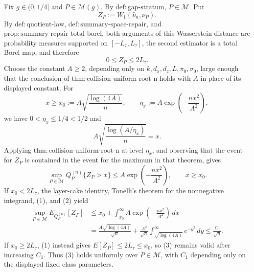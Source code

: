 Fix \(g\in(0,1/4]\) and \(P\in\mathcal M(g)\).  By \(\mathrm{def:gap\text{-}stratum}\), \(P\in\mathcal M\).  Put
\[
 Z_P:=W_1(\widehat\nu_n,\nu_P).
\]
By \(\mathrm{def:quotient\text{-}law}\), \(\mathrm{def:summary\text{-}space\text{-}repair}\), and \(\mathrm{prop:summary\text{-}repair\text{-}total\text{-}borel}\), both arguments of this Wasserstein distance are probability measures supported on \([-L_{\tau},L_{\tau}]\), the second estimator is a total Borel map, and therefore
\[
 0\le Z_P\le 2L_{\tau}.                                                    \tag{1}
\]
Choose the constant \(A\ge2\), depending only on \(k,d_x,d_z,L,\pi_0,\sigma_0\), large enough that the conclusion of \(\mathrm{thm:collision\text{-}uniform\text{-}root\text{-}n}\) holds with \(A\) in place of its displayed constant.  For
\[
 x\ge x_0:=A\sqrt{\frac{\log(4A)}{n}},
 \qquad
 \eta_x:=A\exp\!\left(-\frac{nx^2}{A^2}\right),
\]
we have \(0<\eta_x\le1/4<1/2\) and
\[
 A\sqrt{\frac{\log(A/\eta_x)}{n}}=x.
\]
Applying \(\mathrm{thm:collision\text{-}uniform\text{-}root\text{-}n}\) at level \(\eta_x\), and observing that the event for \(Z_P\) is contained in the event for the maximum in that theorem, gives
\[
 \sup_{P\in\mathcal M}Q_P^{(n)}\{Z_P>x\}
 \le A\exp\!\left(-\frac{nx^2}{A^2}\right),
 \qquad x\ge x_0.                                                          \tag{2}
\]
If \(x_0<2L_{\tau}\), the layer-cake identity, Tonelli's theorem for the nonnegative integrand, (1), and (2) yield
\[
\begin{aligned}
 \sup_{P\in\mathcal M}E_{Q_P^{(n)}}[Z_P]
 &\le x_0+\int_{x_0}^{\infty}
 A\exp\!\left(-\frac{nx^2}{A^2}\right)\,dx\\
 &=\frac{A\sqrt{\log(4A)}}{\sqrt n}
   +\frac{A^2}{\sqrt n}\int_{\sqrt{\log(4A)}}^\infty e^{-y^2}\,dy
 \le \frac{C_1}{\sqrt n}.                                                  \tag{3}
\end{aligned}
\]
If \(x_0\ge2L_{\tau}\), (1) instead gives \(E[Z_P]\le2L_{\tau}\le x_0\), so (3) remains valid after increasing \(C_1\).  Thus (3) holds uniformly over \(P\in\mathcal M\), with \(C_1\) depending only on the displayed fixed class parameters.

